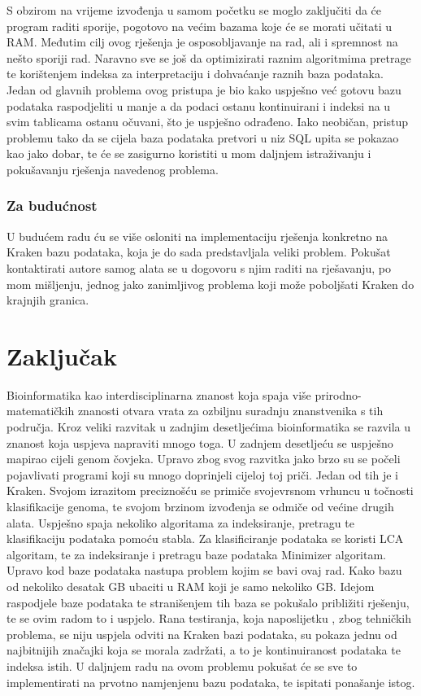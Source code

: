 \documentclass[times, utf8, zavrsni]{fer}
\begin{document}
{S obzirom na vrijeme izvođenja u samom početku se moglo zaključiti da će program raditi sporije, pogotovo na većim bazama koje će se morati učitati u RAM. Međutim cilj ovog rješenja je osposobljavanje na rad, ali i spremnost na nešto sporiji rad. Naravno sve se još da optimizirati raznim algoritmima pretrage te korištenjem indeksa za interpretaciju i dohvaćanje raznih baza podataka. Jedan od glavnih problema ovog pristupa je bio kako uspješno već gotovu bazu podataka raspodjeliti u manje a da podaci ostanu kontinuirani i indeksi na u svim tablicama ostanu očuvani, što je uspješno odrađeno. Iako neobičan, pristup problemu tako da se cijela baza podataka pretvori u niz SQL upita se pokazao kao jako dobar, te će se zasigurno koristiti u mom daljnjem istraživanju i pokušavanju rješenja navedenog problema.
\subsection{Za budućnost}
U budućem radu ću se više osloniti na implementaciju rješenja konkretno na Kraken bazu podataka, koja je do sada predstavljala veliki problem. Pokušat kontaktirati autore samog alata se u dogovoru s njim raditi na rješavanju, po mom mišljenju, jednog jako zanimljivog problema koji može poboljšati Kraken do krajnjih granica.
\chapter{Zaključak}
Bioinformatika kao interdisciplinarna znanost koja spaja više prirodno-matematičkih znanosti otvara vrata za ozbiljnu suradnju znanstvenika s tih područja. Kroz veliki razvitak u zadnjim desetljećima bioinformatika se razvila u znanost koja uspjeva napraviti mnogo toga. U zadnjem desetljeću se uspješno mapirao cijeli genom čovjeka. Upravo zbog svog razvitka jako brzo su se počeli pojavlivati programi koji su mnogo doprinjeli cijeloj toj priči. Jedan od tih je i Kraken. Svojom izrazitom preciznošću se primiče svojevrsnom vrhuncu u točnosti klasifikacije genoma, te svojom brzinom izvođenja se odmiče od većine drugih alata. Uspješno spaja nekoliko algoritama za indeksiranje, pretragu te klasifikaciju podataka pomoću stabla. Za klasificiranje podataka se koristi LCA algoritam, te za indeksiranje i pretragu baze podataka Minimizer algoritam. Upravo kod baze podataka nastupa problem kojim se bavi ovaj rad. Kako bazu od nekoliko desatak GB ubaciti u RAM koji je samo nekoliko GB. Idejom raspodjele baze podataka te stranišenjem tih baza se pokušalo približiti rješenju, te se ovim radom to i uspjelo. Rana testiranja, koja naposlijetku , zbog tehničkih problema, se niju uspjela odviti na Kraken bazi podataka, su pokaza jednu od najbitnijih značajki koja se morala zadržati, a to je kontinuiranost podataka te indeksa istih. U daljnjem radu na ovom problemu pokušat će se sve to implementirati na prvotno namjenjenu bazu podataka, te ispitati ponašanje istog.

}
\end{document}
